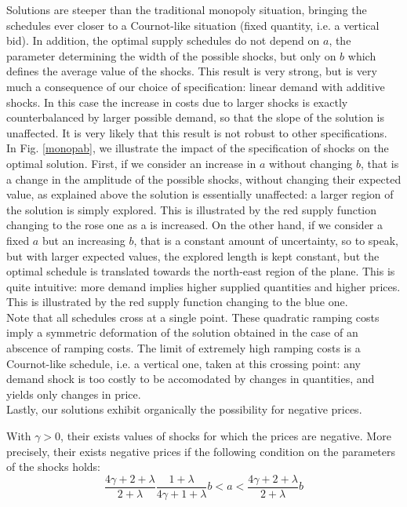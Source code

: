 Solutions are steeper than the traditional monopoly situation, bringing the schedules ever closer to a Cournot-like situation (fixed quantity, i.e. a vertical bid). In addition, the optimal supply schedules do not depend on $a$, the parameter determining the width of the possible shocks, but only on $b$ which defines the average value of the shocks. This result is very strong, but is very much a consequence of our choice of specification: linear demand with additive shocks. In this case the increase in costs due to larger shocks is exactly counterbalanced by larger possible demand, so that the slope of the solution is unaffected. It is very likely that this result is not robust to other specifications.  \\

In Fig. \ref{monopab}, we illustrate the impact of the specification of shocks on the optimal solution. First, if we consider an increase in $a$ without changing $b$, that is a change in the amplitude of the possible shocks, without changing their expected value, as explained above the solution is essentially unaffected: a larger region of the solution is simply explored. This is illustrated by the red supply function changing to the rose one as a is increased. On the other hand, if we consider a fixed $a$ but an increasing $b$, that is a constant amount of uncertainty, so to speak, but with larger expected values, the explored length is kept constant, but the optimal schedule is translated towards the north-east region of the plane. This is quite intuitive: more demand implies higher supplied quantities and higher prices. This is illustrated by the red supply function changing to the blue one. \\

Note that all schedules cross at a single point. These quadratic ramping costs imply a symmetric deformation of the solution obtained in the case of an abscence of ramping costs. The limit of extremely high ramping costs is a Cournot-like schedule, i.e. a vertical one, taken at this crossing point: any demand shock is too costly to be accomodated by changes in quantities, and yields only changes in price. \\

Lastly, our solutions exhibit organically the possibility for negative prices. 

\begin{proposition}\label{monopequilibrianeg}
With $\gamma > 0 $, their exists values of shocks for which the prices are negative. More precisely, their exists negative prices if the following condition on the parameters of the shocks holds:
$$\frac{4\gamma+2+\lambda}{2+\lambda}\frac{1+\lambda}{4\gamma+1+\lambda}b<a<\frac{4\gamma+2+\lambda}{2+\lambda}b$$
\end{proposition}


